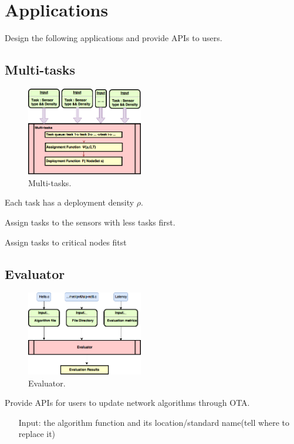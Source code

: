 \section{Applications}

Design the following applications and provide APIs to users.

\subsection{Multi-tasks}

\begin{figure}[htbp]
	\centering
	\includegraphics[width=2in]{Figure/Multi-tasks}
	\caption{Multi-tasks.}
	\label{system}
\end{figure}

Each task has a deployment density $\rho$.

Assign tasks to the sensors with less tasks first.

Assign tasks to critical nodes fitst

\subsection{Evaluator}

\begin{figure}[htbp]
	\centering
	\includegraphics[width=2in]{Figure/Evaluator}
	\caption{Evaluator.}
	\label{system}
\end{figure}

Provide APIs for users to update network algorithms through OTA.
\begin{itemize}
\item[Input:] the algorithm function and its location/standard name(tell where to replace it) 
\end{itemize}

